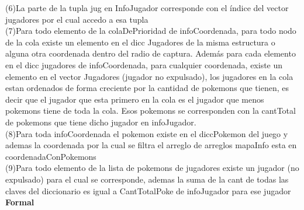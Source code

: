 \begin{Representacion}
(6)La parte de la tupla jug en InfoJugador corresponde con el índice del vector jugadores por el cual accedo a esa tupla\\

(7)Para todo elemento de la colaDePrioridad de infoCoordenada, para todo nodo de la cola existe un elemento en el dicc Jugadores de la misma estructura o alguna otra coordenada dentro del radio de captura. Además para cada elemento en el dicc jugadores de infoCoordenada, para cualquier coordenada, existe un elemento en el vector Jugadores (jugador no expulsado), los jugadores en la cola estan ordenados de forma creciente por la cantidad de pokemons que tienen, es decir que el jugador que esta primero en la cola es el jugador que menos pokemons tiene de toda la cola. Esos pokemons se corresponden con la cantTotal de pokemons que tiene dicho jugador en infoJugador.\\

(8)Para toda infoCoordenada el pokemon existe en el diccPokemon del juego y ademas la coordenada por la cual se filtra el arreglo de arreglos mapaInfo esta en coordenadaConPokemons \\

(9)Para todo elemento de la lista de pokemons de jugadores existe un jugador (no expulsado) para el cual se corresponde, ademas la suma de la cant de todas las claves del diccionario es igual a CantTotalPoke de infoJugador para ese jugador\\

\textbf{Formal}


\end{Representacion}
